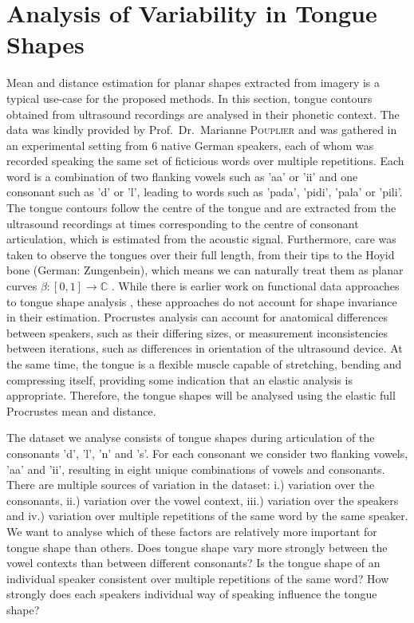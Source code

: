 \section{Analysis of Variability in Tongue Shapes}
\label{sec:4-tounges}
Mean and distance estimation for planar shapes extracted from imagery is a typical use-case for the proposed methods.
In this section, tongue contours obtained from ultrasound recordings are analysed in their phonetic context.
The data was kindly provided by Prof.\ Dr.\ Marianne \textsc{Pouplier} and was gathered in an experimental setting from 6 native German speakers, each of whom was recorded speaking the same set of ficticious words over multiple repetitions.
Each word is a combination of two flanking vowels such as 'aa' or 'ii' and one consonant such as 'd' or 'l', leading to words such as 'pada', 'pidi', 'pala' or 'pili'.
The tongue contours follow the centre of the tongue and are extracted from the ultrasound recordings at times corresponding to the centre of consonant articulation, which is estimated from the acoustic signal.
Furthermore, care was taken to observe the tongues over their full length, from their tips to the Hoyid bone (German: Zungenbein),  which means we can naturally treat them as planar curves $\beta : [0,1] \rightarrow \mathbb{C}$ \parencite[see][]{consulting}.
While there is earlier work on functional data approaches to tongue shape analysis \parencite{CederbaumEtAl2016,Davidson2006,PouplierEtAl2014}, these approaches do not account for shape invariance in their estimation.
Procrustes analysis can account for anatomical differences between speakers, such as their differing sizes, or measurement inconsistencies between iterations, such as differences in orientation of the ultrasound device.
At the same time, the tongue is a flexible muscle capable of stretching, bending and compressing itself, providing some indication that an elastic analysis is appropriate. 
Therefore, the tongue shapes will be analysed using the elastic full Procrustes mean and distance.

The dataset we analyse consists of tongue shapes during articulation of the consonants 'd', 'l', 'n' and 's'.
For each consonant we consider two flanking vowels, 'aa' and 'ii', resulting in eight unique combinations of vowels and consonants.
There are multiple sources of variation in the dataset: i.) variation over the consonants, ii.) variation over the vowel context, iii.) variation over the speakers and iv.) variation over multiple repetitions of the same word by the same speaker.
We want to analyse which of these factors are relatively more important for tongue shape than others.
Does tongue shape vary more strongly between the vowel contexts than between different consonants?
Is the tongue shape of an individual speaker consistent over multiple repetitions of the same word?
How strongly does each speakers individual way of speaking influence the tongue shape?

